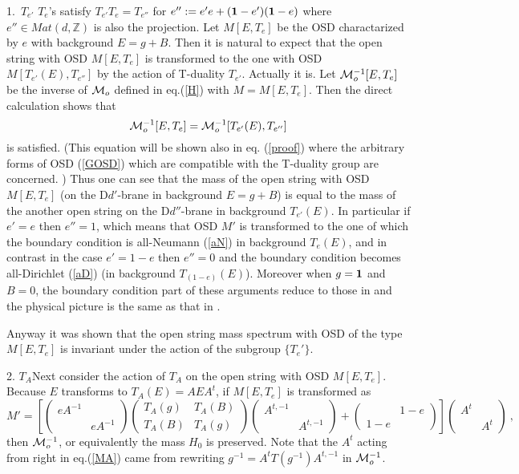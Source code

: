 \documentclass[a4paper,12pt]{article}
\newcommand{\Z}{{\mathbb{Z}}}
\newcommand{\bp}{\begin{pmatrix}}
\newcommand{\ep}{\end{pmatrix}}
\newcommand{\no}{\nonumber}
\def \cM{{\cal M}}
\def \1{{\bf 1}}
\def \Mat{\mathit{Mat}}
\begin{document}
1.\ $T_{e'}$\quad 
$T_e$'s satisfy $T_{e'}T_e=T_{e''}$ for $e'':=e'e+(\1-e')(\1-e)$ 
where $e''\in\Mat(d,\Z)$ is also the projection. 
Let $M[E,T_e]$ be the OSD charactarized by $e$ with background $E=g+B$. 
Then it is natural to expect that the open string with OSD $M[E,T_e]$ 
is transformed to the one with OSD $M[T_{e'}(E),T_{e''}]$ by the action 
of T-duality $T_{e'}$. 
Actually it is. Let $\cM^{-1}_o[E,T_e]$ be the inverse of $\cM_o$ defined 
in eq.(\ref{H}) with $M=M[E,T_e]$. Then 
the direct calculation shows that 
\begin{equation}
 \cM^{-1}_o[E,T_e]=\cM^{-1}_o[T_{e'}(E),T_{e''}]\no
\end{equation}
is satisfied. (This equation will be shown also in eq. (\ref{proof}) 
where the arbitrary forms of OSD (\ref{GOSD}) 
which are compatible with the T-duality group are concerned. )
Thus one can see that the mass of the open string 
with OSD $M[E,T_e]$ (on the D$d'$-brane in background $E=g+B$) 
is equal to the mass of the another open string on the D$d''$-brane 
in background $T_{e'}(E)$. 
In particular if $e'=e$ then $e''=1$, which means 
that OSD $M'$ is transformed to the one 
of which the boundary condition is all-Neumann (\ref{aN}) 
in background $T_e(E)$, 
and in contrast in the case $e'=1-e$ then $e''=0$ and 
the boundary condition becomes all-Dirichlet (\ref{aD}) 
(in background $T_{(1-e)}(E)$). 
Moreover when $g={\bf 1}$ and $B=0$, 
the boundary condition part of these arguments 
reduce to those in \cite{DLP} and the physical picture is the same as 
that in \cite{T}. 

Anyway it was shown that the open string mass spectrum 
with OSD of the type $M[E,T_e]$ is invariant under the action of 
the subgroup $\{T_e'\}$. 


2. $T_A$\quad Next consider the action of $T_A$ on the open string 
with OSD $M[E,T_e]$. Because $E$ transforms to $T_A(E)=AEA^t$, 
if $M[E,T_e]$ is transformed as
\begin{equation}
 M'= \left[\bp e A^{-1}& \\ &e A^{-1}\ep
 \bp T_A(g)&T_A(B)\\ T_A(B)&T_A(g)\ep \bp A^{t,-1}& \\ &A^{t,-1}\ep
 +\bp & 1-e\\ 1-e & \ep\right] \bp A^t& \\ &A^t\ep\ , \label{MA}
\end{equation}
then $\cM_o^{-1}$, or equivalently the mass $H_0$ is preserved.
Note that the $A^t$ acting from right in eq.(\ref{MA}) came from 
rewriting $g^{-1}= A^tT(g^{-1})A^{t,-1}$ in $\cM_o^{-1}$.     
\end{document}
